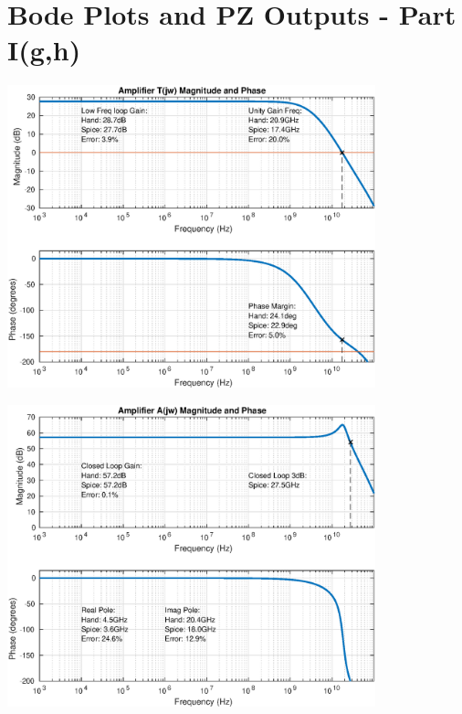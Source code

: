 \documentclass[12pt,a4paper]{article}
\begin{document}
\section{Bode Plots and PZ Outputs - Part I(g,h)}

{\centering
	\includegraphics[width=0.8\textwidth]{plots/part_g.eps}
\par}

\pagebreak

{\centering
	\includegraphics[width=0.8\textwidth]{plots/part_h.eps}
\par}
\end{document}
